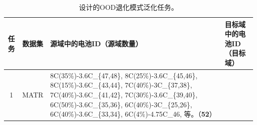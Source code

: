 \documentclass[UTF8,lettersize,journal]{IEEEtran}
\begin{document}
  \begin{table}[htbp]
    \vspace{-1em}
    \footnotesize
      \centering
      \caption{设计的OOD退化模式泛化任务。}
      \begin{threeparttable}
        \begin{tabularx}{\textwidth}{ccXX}
        \toprule
        任务 & 数据集 & 源域中的电池ID（\textbf{源域数量}） & 目标域中的电池ID（\textbf{目标域}） \\
        \midrule
        1     & MATR  & 8C(35\%)-3.6C\_\{47,48\}, 8C(25\%)-3.6C\_\{45,46\}, \newline
        8C(15\%)-3.6C\_\{43,44\}, 7C(40\%)-3C\_\{37,38\}, \newline
        7C(40\%)-3.6C\_\{41,42\}, 7C(30\%)-3.6C\_\{39,40\}, \newline
        6C(50\%)-3.6C\_\{35,36\}, 6C(40\%)-3C\_\{25,26\}, \newline
        6C(40\%)-3.6C\_\{33,34\}, 6C(4\%)-4.75C\_46, \newline
        等\tnote{a}。（\textbf{52}）

\end{tabularx}
\end{threeparttable}
\end{table}
\end{document}

